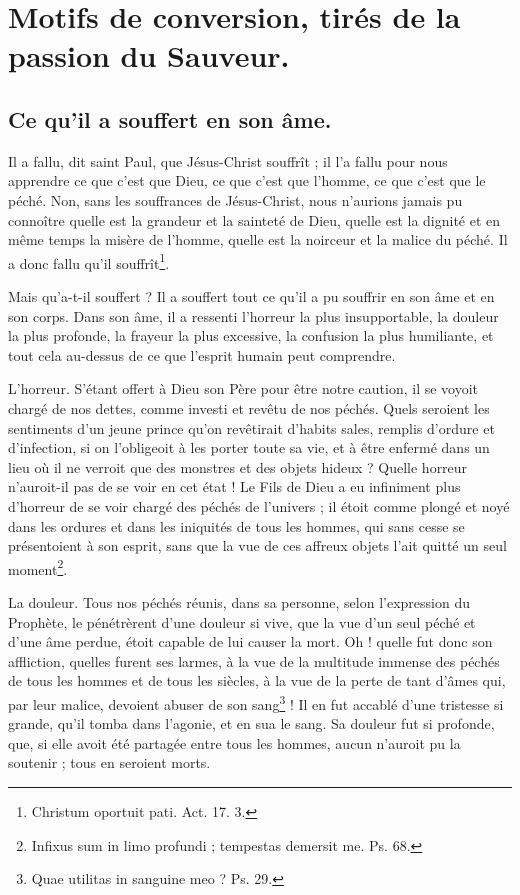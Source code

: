 \documentclass[instructions.tex]{subfiles}
\begin{document}
\chapter{Motifs de conversion, tirés de la passion du Sauveur.}

\section{Ce qu’il a souffert en son âme.}

Il a fallu, dit saint Paul, que Jésus-Christ souffrît ; il l’a fallu pour nous apprendre ce que c’est que Dieu, ce que c’est que l’homme, ce que c’est que le péché. Non, sans les souffrances de Jésus-Christ, nous n’aurions jamais pu connoître quelle est la grandeur et la sainteté de Dieu, quelle est la dignité et en même temps la misère de l’homme, quelle est la noirceur et la malice du péché. Il a donc fallu qu’il souffrît\footnote{Christum oportuit pati. Act. 17. 3.}.

Mais qu’a-t-il souffert ? Il a souffert tout ce qu’il a pu souffrir en son âme et en son corps. Dans son âme, il a ressenti l’horreur la plus insupportable, la douleur la plus profonde, la frayeur la plus excessive, la confusion la plus humiliante, et tout cela au-dessus de ce que l’esprit humain peut comprendre.

\primo L’horreur. S’étant offert à Dieu son Père pour être notre caution, il se voyoit chargé de nos dettes, comme investi et revêtu de nos péchés. Quels seroient les sentiments d’un jeune prince qu’on revêtirait d’habits sales, remplis d’ordure et d’infection, si on l’obligeoit à les porter toute sa vie, et à être enfermé dans un lieu où il ne verroit que des monstres et des objets hideux ? Quelle horreur n’auroit-il pas de se voir en cet état ! Le Fils de Dieu a eu infiniment plus d’horreur de se voir chargé des péchés de l’univers ; il étoit comme plongé et noyé dans les ordures et dans les iniquités de tous les hommes, qui sans cesse se présentoient à son esprit, sans que la vue de ces affreux objets l’ait quitté un seul moment\footnote{Infixus sum in limo profundi ; tempestas demersit me. Ps. 68.}.

\secundo La douleur. Tous nos péchés réunis, dans sa personne, selon l’expression du Prophète, le pénétrèrent d’une douleur si vive, que la vue d’un seul péché et d’une âme perdue, étoit capable de lui causer la mort. Oh ! quelle fut donc son affliction, quelles furent ses larmes, à la vue de la multitude immense des péchés de tous les hommes et de tous les siècles, à la vue de la perte de tant d’âmes qui, par leur malice, devoient abuser de son sang\footnote{Quae utilitas in sanguine meo ? Ps. 29.} ! Il en fut accablé d’une tristesse si grande, qu’il tomba dans l’agonie, et en sua le sang. Sa douleur fut si profonde, que, si elle avoit été partagée entre tous les hommes, aucun n’auroit pu la soutenir ; tous en seroient morts.
\end{document}
